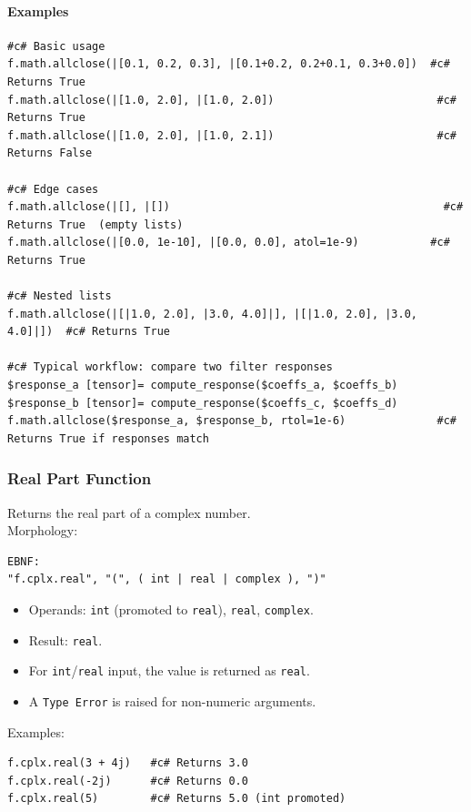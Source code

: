 \paragraph{Examples}
\begin{verbatim}
#c# Basic usage
f.math.allclose(|[0.1, 0.2, 0.3], |[0.1+0.2, 0.2+0.1, 0.3+0.0])  #c# Returns True
f.math.allclose(|[1.0, 2.0], |[1.0, 2.0])                         #c# Returns True
f.math.allclose(|[1.0, 2.0], |[1.0, 2.1])                         #c# Returns False

#c# Edge cases
f.math.allclose(|[], |[])                                          #c# Returns True  (empty lists)
f.math.allclose(|[0.0, 1e-10], |[0.0, 0.0], atol=1e-9)           #c# Returns True

#c# Nested lists
f.math.allclose(|[|1.0, 2.0], |3.0, 4.0]|], |[|1.0, 2.0], |3.0, 4.0]|])  #c# Returns True

#c# Typical workflow: compare two filter responses
$response_a [tensor]= compute_response($coeffs_a, $coeffs_b)
$response_b [tensor]= compute_response($coeffs_c, $coeffs_d)
f.math.allclose($response_a, $response_b, rtol=1e-6)              #c# Returns True if responses match
\end{verbatim}

\label{sec:complex_functions}

\subsubsection{Real Part Function}
Returns the real part of a complex number. \\
Morphology:
\begin{verbatim}
EBNF:
"f.cplx.real", "(", ( int | real | complex ), ")"
\end{verbatim}
\begin{itemize}
\item Operands: \texttt{int} (promoted to \texttt{real}), \texttt{real}, \texttt{complex}.
\item Result: \texttt{real}.
\item For \texttt{int}/\texttt{real} input, the value is returned as \texttt{real}.
\item A \texttt{Type Error} is raised for non-numeric arguments.
\end{itemize}
Examples:
\begin{verbatim}
f.cplx.real(3 + 4j)   #c# Returns 3.0
f.cplx.real(-2j)      #c# Returns 0.0
f.cplx.real(5)        #c# Returns 5.0 (int promoted)
\end{verbatim}

